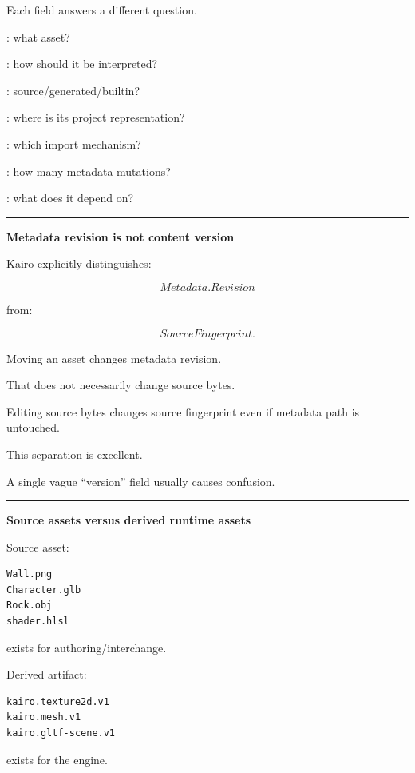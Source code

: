 Each field answers a different question.

: what asset?

: how should it be interpreted?

: source/generated/builtin?

: where is its project representation?

: which import mechanism?

: how many metadata mutations?

: what does it depend on?

\begin{center}\rule{0.5\linewidth}{0.5pt}\end{center}

\textbf{Metadata revision is not content version}

Kairo explicitly distinguishes:

\[
Metadata.Revision
\]

from:

\[
SourceFingerprint.
\]

Moving an asset changes metadata revision.

That does not necessarily change source bytes.

Editing source bytes changes source fingerprint even if metadata path is untouched.

This separation is excellent.

A single vague ``version'' field usually causes confusion.

\begin{center}\rule{0.5\linewidth}{0.5pt}\end{center}

\textbf{Source assets versus derived runtime assets}

Source asset:

\begin{verbatim}
Wall.png
Character.glb
Rock.obj
shader.hlsl
\end{verbatim}

exists for authoring/interchange.

Derived artifact:

\begin{verbatim}
kairo.texture2d.v1
kairo.mesh.v1
kairo.gltf-scene.v1
\end{verbatim}

exists for the engine.

